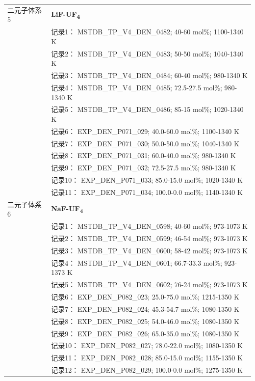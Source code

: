 \documentclass[12pt]{article}
\begin{document}
{\begin{longtable}[]{@{}
  >{\raggedright\arraybackslash}p{}
  >{\raggedright\arraybackslash}p{}@{}}
二元子体系 5  & \textbf{LiF-UF\textsubscript{4}} \\
 & 记录1： MSTDB\_TP\_V4\_DEN\_0482; 40-60 mol\%; 1100-1340 K \\
 & 记录2： MSTDB\_TP\_V4\_DEN\_0483; 50-50 mol\%; 1040-1340 K \\
 & 记录3： MSTDB\_TP\_V4\_DEN\_0484; 60-40 mol\%; 980-1340 K \\
 & 记录4： MSTDB\_TP\_V4\_DEN\_0485; 72.5-27.5 mol\%; 980-1340 K \\
 & 记录5： MSTDB\_TP\_V4\_DEN\_0486; 85-15 mol\%; 1020-1340 K \\
 & 记录6： EXP\_DEN\_P071\_029; 40.0-60.0 mol\%; 1100-1340 K \\
 & 记录7： EXP\_DEN\_P071\_030; 50.0-50.0 mol\%; 1040-1340 K \\
 & 记录8： EXP\_DEN\_P071\_031; 60.0-40.0 mol\%; 980-1340 K \\
 & 记录9： EXP\_DEN\_P071\_032; 72.5-27.5 mol\%; 980-1340 K \\
 & 记录10： EXP\_DEN\_P071\_033; 85.0-15.0 mol\%; 1020-1340 K \\
 & 记录11： EXP\_DEN\_P071\_034; 100.0-0.0 mol\%; 1140-1340 K  \\

二元子体系 6  & \textbf{NaF-UF\textsubscript{4}} \\
 & 记录1： MSTDB\_TP\_V4\_DEN\_0598; 40-60 mol\%; 973-1073 K \\
 & 记录2： MSTDB\_TP\_V4\_DEN\_0599; 46-54 mol\%; 973-1073 K \\
 & 记录3： MSTDB\_TP\_V4\_DEN\_0600; 58-42 mol\%; 973-1073 K \\
 & 记录4： MSTDB\_TP\_V4\_DEN\_0601; 66.7-33.3 mol\%; 923-1373 K \\
 & 记录5： MSTDB\_TP\_V4\_DEN\_0602; 76-24 mol\%; 973-1073 K \\
 & 记录6： EXP\_DEN\_P082\_023; 25.0-75.0 mol\%; 1215-1350 K \\
 & 记录7： EXP\_DEN\_P082\_024; 45.3-54.7 mol\%; 1080-1350 K \\
 & 记录8： EXP\_DEN\_P082\_025; 54.0-46.0 mol\%; 1080-1350 K \\
 & 记录9： EXP\_DEN\_P082\_026; 65.0-35.0 mol\%; 1080-1350 K \\
 & 记录10： EXP\_DEN\_P082\_027; 78.0-22.0 mol\%; 1080-1350 K \\
 & 记录11： EXP\_DEN\_P082\_028; 85.0-15.0 mol\%; 1155-1350 K \\
 & 记录12： EXP\_DEN\_P082\_029; 100.0-0.0 mol\%; 1275-1350 K  \\


\end{longtable}}
\end{document}
